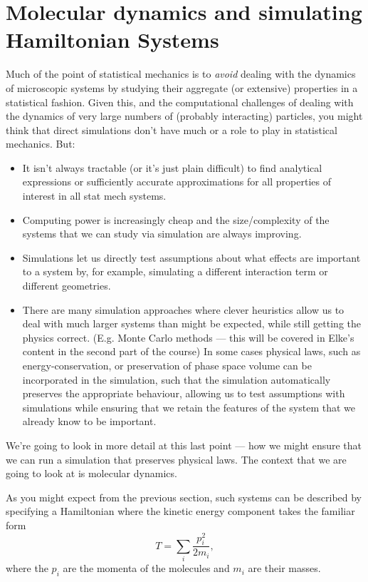 \section{Molecular dynamics and simulating Hamiltonian Systems}

Much of the point of statistical mechanics is to \emph{avoid} dealing with the dynamics of microscopic systems by studying their aggregate (or extensive) properties in a statistical fashion. Given this, and the computational challenges of dealing with the dynamics of very large numbers of (probably interacting) particles, you might think that direct simulations don't have much or a role to play in statistical mechanics. But:
\begin{itemize}
	\item It isn't always tractable (or it's just plain difficult) to find analytical expressions or sufficiently accurate approximations for all properties of interest in all stat mech systems.
	\item Computing power is increasingly cheap and the size/complexity of the systems that we can study via simulation are always improving.
	\item Simulations let us directly test assumptions about what effects are important to a system by, for example, simulating a different interaction term or different geometries.
	\item There are many simulation approaches where clever heuristics allow us to deal with much larger systems than might be expected, while still getting the physics correct. (E.g. Monte Carlo methods --- this will be covered in Elke's content in the second part of the course) In some cases physical laws, such as energy-conservation, or preservation of phase space volume can be incorporated in the simulation, such that the simulation automatically preserves the appropriate behaviour, allowing us to test assumptions with simulations while ensuring that we retain the features of the system that we already know to be important.
\end{itemize}

We're going to look in more detail at this last point --- how we might ensure that we can run a simulation that preserves physical laws. The context that we are going to look at is molecular dynamics.

As you might expect from the previous section, such systems can be described by specifying a Hamiltonian where the kinetic energy component takes the familiar form
$$ T = \sum_i \frac{{p}_i^2}{2m_i},$$
where the $p_i$ are the momenta of the molecules and $m_i$ are their masses.

